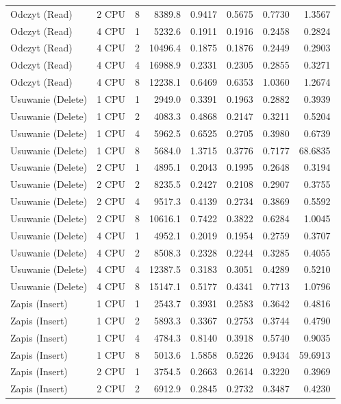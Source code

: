 \begin{table}[ht]
{\begin{tabular}{llcrrrrr}
Odczyt (Read) & 2 CPU & 8 & 8389.8 & 0.9417 & 0.5675 & 0.7730 & 1.3567 \\
Odczyt (Read) & 4 CPU & 1 & 5232.6 & 0.1911 & 0.1916 & 0.2458 & 0.2824 \\
Odczyt (Read) & 4 CPU & 2 & 10496.4 & 0.1875 & 0.1876 & 0.2449 & 0.2903 \\
Odczyt (Read) & 4 CPU & 4 & 16988.9 & 0.2331 & 0.2305 & 0.2855 & 0.3271 \\
Odczyt (Read) & 4 CPU & 8 & 12238.1 & 0.6469 & 0.6353 & 1.0360 & 1.2674 \\
Usuwanie (Delete) & 1 CPU & 1 & 2949.0 & 0.3391 & 0.1963 & 0.2882 & 0.3939 \\
Usuwanie (Delete) & 1 CPU & 2 & 4083.3 & 0.4868 & 0.2147 & 0.3211 & 0.5204 \\
Usuwanie (Delete) & 1 CPU & 4 & 5962.5 & 0.6525 & 0.2705 & 0.3980 & 0.6739 \\
Usuwanie (Delete) & 1 CPU & 8 & 5684.0 & 1.3715 & 0.3776 & 0.7177 & 68.6835 \\
Usuwanie (Delete) & 2 CPU & 1 & 4895.1 & 0.2043 & 0.1995 & 0.2648 & 0.3194 \\
Usuwanie (Delete) & 2 CPU & 2 & 8235.5 & 0.2427 & 0.2108 & 0.2907 & 0.3755 \\
Usuwanie (Delete) & 2 CPU & 4 & 9517.3 & 0.4139 & 0.2734 & 0.3869 & 0.5592 \\
Usuwanie (Delete) & 2 CPU & 8 & 10616.1 & 0.7422 & 0.3822 & 0.6284 & 1.0045 \\
Usuwanie (Delete) & 4 CPU & 1 & 4952.1 & 0.2019 & 0.1954 & 0.2759 & 0.3707 \\
Usuwanie (Delete) & 4 CPU & 2 & 8508.3 & 0.2328 & 0.2244 & 0.3285 & 0.4055 \\
Usuwanie (Delete) & 4 CPU & 4 & 12387.5 & 0.3183 & 0.3051 & 0.4289 & 0.5210 \\
Usuwanie (Delete) & 4 CPU & 8 & 15147.1 & 0.5177 & 0.4341 & 0.7713 & 1.0796 \\
Zapis (Insert) & 1 CPU & 1 & 2543.7 & 0.3931 & 0.2583 & 0.3642 & 0.4816 \\
Zapis (Insert) & 1 CPU & 2 & 5893.3 & 0.3367 & 0.2753 & 0.3744 & 0.4790 \\
Zapis (Insert) & 1 CPU & 4 & 4784.3 & 0.8140 & 0.3918 & 0.5740 & 0.9035 \\
Zapis (Insert) & 1 CPU & 8 & 5013.6 & 1.5858 & 0.5226 & 0.9434 & 59.6913 \\
Zapis (Insert) & 2 CPU & 1 & 3754.5 & 0.2663 & 0.2614 & 0.3220 & 0.3969 \\
Zapis (Insert) & 2 CPU & 2 & 6912.9 & 0.2845 & 0.2732 & 0.3487 & 0.4230 \\

\end{tabular}}
\end{table}
